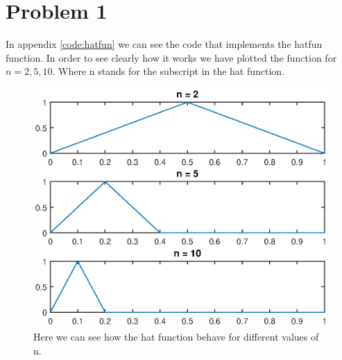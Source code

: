 \documentclass[11pt]{article}
\begin{document}
\section{Problem 1}
In appendix \ref{code:hatfun} we can see the code that implements the hatfun function. In order to see clearly how it works we have plotted the function for $n = 2,5,10$. Where n stands for the subscript in the hat function. 
\begin{figure}[H]
	\centering
	\includegraphics[width=1\textwidth]{../ex1/hatplot}
	\caption{Here we can see how the hat function behave for different values of n.}
	\label{fig:hatplot}
\end{figure}
\end{document}

